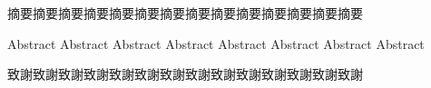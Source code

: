 %


% 
% 

\newpage
\setcounter{page}{1}

\begin{abstractZh}  %
摘要摘要摘要摘要摘要摘要摘要摘要摘要摘要摘要摘要摘要摘要
\end{abstractZh}

\begin{abstractEn}  %
Abstract Abstract Abstract Abstract Abstract Abstract Abstract Abstract
\end{abstractEn} 

\newpage
\begin{acknowledgement} %
\par
致謝致謝致謝致謝致謝致謝致謝致謝致謝致謝致謝致謝致謝致謝
\end{acknowledgement}

{\singlespacing\selectfont
	\newpage{}
	\tableofcontents %

	\newpage{}
	\listoftables  %
	
	\newpage{}
	\listoffigures  %
}
